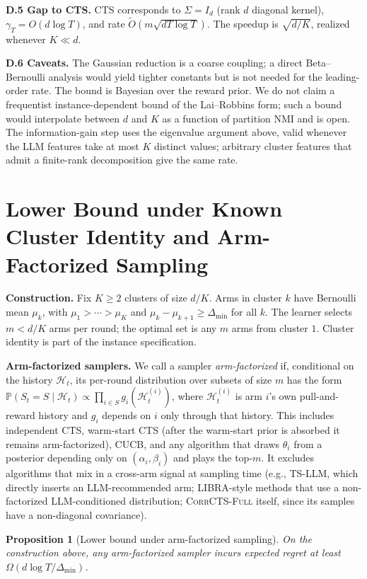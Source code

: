 \documentclass{article}
\theoremstyle{plain}
\newtheorem{proposition}[theorem]{Proposition}
\theoremstyle{definition}
\theoremstyle{remark}
\newcommand{\Prob}{\mathbb{P}}
\newcommand{\gap}{\Delta_{\min}}
\newcommand{\CorrFull}{\textsc{CorrCTS-Full}}
\begin{document}
\textbf{D.5 Gap to CTS.}
CTS corresponds to $\Sigma = I_d$ (rank $d$ diagonal kernel), $\gamma_T = O(d \log T)$, and rate $\tilde O(m \sqrt{d T \log T})$.
The speedup is $\sqrt{d/K}$, realized whenever $K \ll d$.

\textbf{D.6 Caveats.}
The Gaussian reduction is a coarse coupling; a direct Beta--Bernoulli analysis would yield tighter constants but is not needed for the leading-order rate.
The bound is Bayesian over the reward prior. We do not claim a frequentist instance-dependent bound of the Lai--Robbins form; such a bound would interpolate between $d$ and $K$ as a function of partition NMI and is open.
The information-gain step uses the eigenvalue argument above, valid whenever the LLM features take at most $K$ distinct values; arbitrary cluster features that admit a finite-rank decomposition give the same rate.

\section{Lower Bound under Known Cluster Identity and Arm-Factorized Sampling}\label{app:lowerbound}

\textbf{Construction.}
Fix $K \geq 2$ clusters of size $d/K$.
Arms in cluster $k$ have Bernoulli mean $\mu_k$, with $\mu_1 > \cdots > \mu_K$ and $\mu_{k} - \mu_{k+1} \geq \gap$ for all $k$.
The learner selects $m < d/K$ arms per round; the optimal set is any $m$ arms from cluster $1$.
Cluster identity is part of the instance specification.

\textbf{Arm-factorized samplers.}
We call a sampler \emph{arm-factorized} if, conditional on the history $\mathcal{H}_t$, its per-round distribution over subsets of size $m$ has the form $\Prob(S_t = S \mid \mathcal{H}_t) \propto \prod_{i \in S} g_i(\mathcal{H}_t^{(i)})$, where $\mathcal{H}_t^{(i)}$ is arm $i$'s own pull-and-reward history and $g_i$ depends on $i$ only through that history.
This includes independent CTS, warm-start CTS (after the warm-start prior is absorbed it remains arm-factorized), CUCB, and any algorithm that draws $\theta_i$ from a posterior depending only on $(\alpha_i, \beta_i)$ and plays the top-$m$.
It excludes algorithms that mix in a cross-arm signal at sampling time (e.g., TS-LLM, which directly inserts an LLM-recommended arm; LIBRA-style methods that use a non-factorized LLM-conditioned distribution; \CorrFull{} itself, since its samples have a non-diagonal covariance).

\begin{proposition}[Lower bound under arm-factorized sampling]\label{prop:lower}
On the construction above, any arm-factorized sampler incurs expected regret at least $\Omega(d \log T / \gap)$.
\end{proposition}
\end{document}

